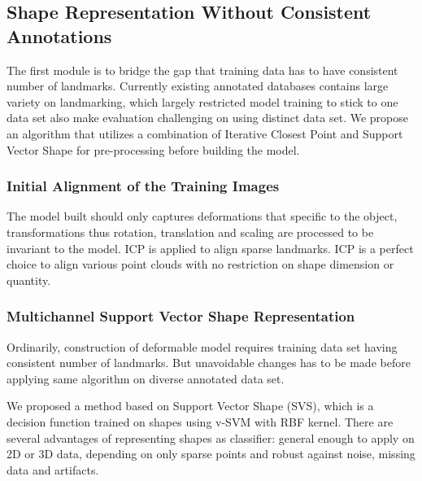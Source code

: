 
\subsection{Shape Representation Without Consistent Annotations}
The first module is to bridge the gap that training data has to have consistent number of landmarks. Currently existing annotated databases contains large variety on landmarking, which largely restricted model training to stick to one data set also make evaluation challenging on using distinct data set. We propose an algorithm that utilizes a combination of Iterative Closest Point and Support Vector Shape for pre-processing before building the model.

\subsubsection{Initial Alignment of the Training Images}

The model built should only captures deformations that specific to the object, transformations thus rotation, translation and scaling are processed to be invariant to the model\cite{?}. ICP is applied to align sparse landmarks. ICP is a perfect choice to align various point clouds with no restriction on shape dimension or quantity.

\subsubsection{Multichannel Support Vector Shape Representation}
Ordinarily, construction of deformable model requires training data set having consistent number of landmarks. But unavoidable changes has to be made before applying same algorithm on diverse annotated data set.

We proposed a method based on Support Vector Shape (SVS)\cite{?}, which is a decision function trained on shapes using v-SVM with RBF kernel. There are several advantages of representing shapes as classifier: general enough to apply on 2D or 3D data, depending on only sparse points and robust against noise, missing data and artifacts.

